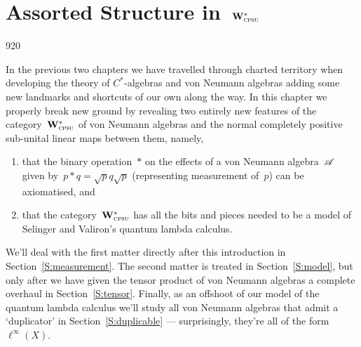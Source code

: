 \chapter{Assorted Structure in~$\mathbf{W}^*_{\text{\textsc{cpsu}}}$}
\begin{parsec}{920}%
\begin{point}{10}%
In the previous two chapters
we have travelled through
charted territory
when developing the theory of $C^*$-algebras
and von Neumann algebras
adding some new landmarks and shortcuts
of our own along the way.
In this chapter
we properly break new ground
by revealing
two entirely new features
of the category~$\mathbf{W}^*_{\text{\textsc{cpsu}}}$
of von Neumann algebras
and the normal completely positive sub-unital
linear maps between them,
namely, 
\begin{enumerate}
\item 
that the binary operation~$\ast$
on the effects of a von Neumann algebra~$\mathscr{A}$
given by~$p\ast q = \sqrt{p}q\sqrt{p}$
(representing measurement of~$p$)
can be axiomatised,
and 
\item 
	that the category~$\mathbf{W}^*_{\text{\textsc{cpsu}}}$
has all the bits and pieces
needed to be a model of Selinger and Valiron's quantum lambda calculus.
\end{enumerate}
We'll deal with the first matter directly after this introduction
in Section~\ref{S:measurement}.
The second matter is treated in Section~\ref{S:model},
but only after
we have given the tensor product of von Neumann 
algebras a complete overhaul
in Section~\ref{S:tensor}.
Finally, as an offshoot of our model
of the quantum lambda calculus
we'll study all
 von Neumann algebras
that admit a `duplicator'
in Section~\ref{S:duplicable}
---
surprisingly, they're
all of the form $\ell^\infty(X)$.
\end{point}
\end{parsec}

